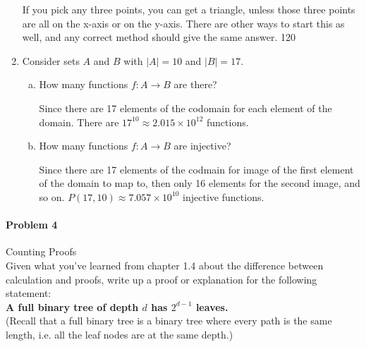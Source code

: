 \documentclass[11pt, a4paper]{article}
\newcommand\setItemNumber[1]{\setcounter{enumi}{\numexpr#1-1\relax}}
\begin{document}
\begin{enumerate}
            If you pick any three points, you can get a triangle, unless those three points are all on the x-axis or on the y-axis. There are other ways to start this as well, and any correct method should give the same answer. 120

        \setItemNumber{12}
        \item Consider sets $A$ and $B$ with $|A| = 10$ and $|B| = 17$.
            \begin{enumerate}[(a)]
                \item How many functions $f: A\rightarrow B$ are there?

                    Since there are 17 elements of the codomain for each element of the domain. There are $17^{10} \approx 2.015 \times 10^{12}$ functions.

                \item How many functions $f: A\rightarrow B$ are injective?

                    Since there are 17 elements of the codmain for image of the first element of the domain to map to, then only 16 elements for the second image, and so on. $P(17, 10) \approx 7.057 \times 10^{10}$ injective functions. 

            \end{enumerate}

    \end{enumerate}


	
	\paragraph{Problem 4} Counting Proofs\\

	Given what you've learned from chapter 1.4 about the difference between calculation and proofs, write up a proof or explanation for the following statement:\\

	\textbf{A full binary tree of depth $d$ has $2^{d-1}$ leaves.} \\

	(Recall that a full binary tree is a binary tree where every path is the same length, i.e. all the leaf nodes are at the same depth.)
	
		
\end{document}
